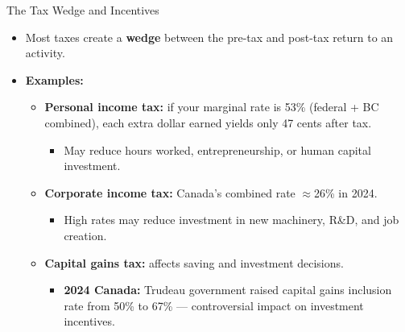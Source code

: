\documentclass[aspectratio=169]{beamer}
\begin{document}
\begin{frame}{The Tax Wedge and Incentives}
\transfade
\begin{itemize}
  \item Most taxes create a \textbf{wedge} between the pre-tax and post-tax return to an activity.
  \item \textbf{Examples:}
  \begin{itemize}
    \item \textbf{Personal income tax:} if your marginal rate is 53\% (federal + BC combined), each extra dollar earned yields only 47 cents after tax.
    \begin{itemize}
      \item May reduce hours worked, entrepreneurship, or human capital investment.
    \end{itemize}
    \item \textbf{Corporate income tax:} Canada's combined rate $\approx$26\% in 2024.
    \begin{itemize}
      \item High rates may reduce investment in new machinery, R\&D, and job creation.
    \end{itemize}
    \item \textbf{Capital gains tax:} affects saving and investment decisions.
    \begin{itemize}
      \item \textbf{2024 Canada:} Trudeau government raised capital gains inclusion rate from 50\% to 67\% --- controversial impact on investment incentives.
    \end{itemize}
  \end{itemize}
\end{itemize}
\end{frame}
\end{document}
